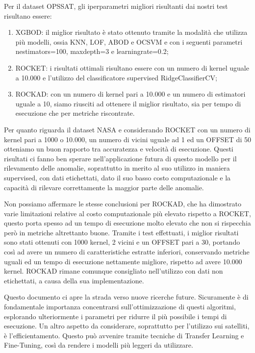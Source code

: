 Per il dataset OPS\textunderscore SAT, gli iperparametri migliori risultanti dai nostri test risultano essere:
\begin{enumerate}
    \item XGBOD: il miglior risultato è stato ottenuto tramite la modalità che utilizza più modelli, ossia KNN, LOF, ABOD e OCSVM e con i seguenti parametri n\textunderscore estimators=100, max\textunderscore depth=3 e learning\textunderscore rate=0.2;
    \item ROCKET: i risultati ottimali risultano essere con un numero di kernel uguale a 10.000 e l'utilizzo del classificatore supervised RidgeClassifierCV;
    \item ROCKAD: con un numero di kernel pari a 10.000 e un numero di estimatori uguale a 10, siamo riusciti ad ottenere il miglior risultato, sia per tempo di esecuzione che per metriche riscontrate.
\end{enumerate}

Per quanto riguarda il dataset NASA e considerando ROCKET con un numero di kernel pari a 1000 o 10.000, un numero di vicini uguale ad 1 ed un OFFSET di 50 otteniamo un buon rapporto tra accuratezza e velocità di esecuzione.
Questi risultati ci fanno ben sperare nell'applicazione futura di questo modello per il rilevamento delle anomalie, soprattutto in merito al suo utilizzo in maniera supervised, con dati etichettati, dato il suo basso costo computazionale e la capacità di rilevare correttamente la maggior parte delle anomalie.

Non possiamo affermare le stesse conclusioni per ROCKAD, che ha dimostrato varie limitazioni relative al costo computazionale più elevato rispetto a ROCKET, questo porta spesso ad un tempo di esecuzione molto elevato che non si rispecchia però in metriche altrettanto buone.
Tramite i test effettuati, i miglior risultati sono stati ottenuti con 1000 kernel, 2 vicini e un OFFSET pari a 30, portando così ad avere un numero di caratteristiche estratte inferiori, conservando metriche uguali ed un tempo di esecuzione nettamente migliore, rispetto ad avere 10.000 kernel.
ROCKAD rimane comunque consigliato nell'utilizzo con dati non etichettati, a causa della sua implementazione.

Questo documento ci apre la strada verso nuove ricerche future.
Sicuramente è di fondamentale importanza concentrarsi sull'ottimizzazione di questi algoritmi, esplorando ulteriormente i parametri per ridurre il più possibile i tempi di esecuzione.
Un altro aspetto da considerare, soprattutto per l'utilizzo sui satelliti, è l'efficientamento. Questo può avvenire tramite tecniche di Transfer Learning e Fine-Tuning, così da rendere i modelli più leggeri da utilizzare.

